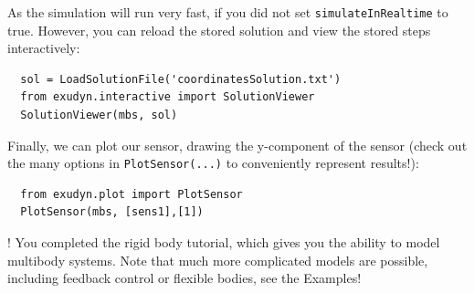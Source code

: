 \noindent As the simulation will run very fast, if you did not set \texttt{simulateInRealtime} to true. However, you can reload the stored solution and view the stored steps interactively:
\pythonstyle\begin{lstlisting}
  sol = LoadSolutionFile('coordinatesSolution.txt')
  from exudyn.interactive import SolutionViewer
  SolutionViewer(mbs, sol)
\end{lstlisting}

\noindent Finally, we can plot our sensor, drawing the y-component of the sensor (check out the many options in \texttt{PlotSensor(...)} to conveniently represent results!):
\pythonstyle\begin{lstlisting}
  from exudyn.plot import PlotSensor
  PlotSensor(mbs, [sens1],[1])
\end{lstlisting}

\noindent {}! You completed the rigid body tutorial, which gives you the ability to model multibody systems. Note that much more complicated models are possible, including feedback control or flexible bodies, see the Examples!




